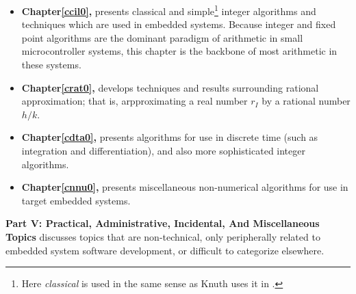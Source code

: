 \begin{itemize}
\item \textbf{Chapter\;\ref{ccil0}, \ccilzerotitle{}} presents
      classical and simple\footnote{Here \emph{classical} is used
	  in the same sense as Knuth uses it in \cite[p. 265]{bibref:b:knuthclassic2ndedvol2}.} 
	  integer algorithms and techniques which 
      are used in embedded systems.  Because integer and fixed point algorithms
      are the dominant paradigm of arithmetic in small microcontroller
      systems, this chapter is the backbone of most arithmetic in these systems.

\item \textbf{Chapter\;\ref{crat0}, \cratzerotitle{}} develops techniques
      and results surrounding rational approximation; that is, arpproximating a real number
      $r_I$ by a rational number $h/k$.

\item \textbf{Chapter\;\ref{cdta0}, \cdtazerotitle{}} presents algorithms
      for use in discrete time (such as integration and differentiation),
      and also more sophisticated integer algorithms.

\item \textbf{Chapter\;\ref{cnnu0}, \cnnuzerotitle{}} presents miscellaneous
      non-numerical algorithms for use in target embedded systems.
\end{itemize}


\textbf{Part V:  Practical, Administrative, Incidental, And Miscellaneous Topics}
discusses topics that are non-technical, only peripherally related to embedded system
software development,
or difficult to categorize elsewhere.

